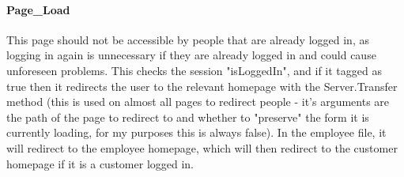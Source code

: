 ﻿\documentclass{article}
\begin{document}
    \paragraph{Page\_Load} This page should not be accessible by people that are already logged in, as logging in again is unnecessary if they are already logged in and could cause unforeseen problems.
    This checks the session "isLoggedIn", and if it tagged as true then it redirects the user to the relevant homepage with the Server.Transfer method (this is used on almost all pages to redirect people - it's arguments are the path of the page to redirect to and whether to "preserve" the form it is currently loading, for my purposes this is always false).
    In the employee file, it will redirect to the employee homepage, which will then redirect to the customer homepage if it is a customer logged in.
\end{document}
